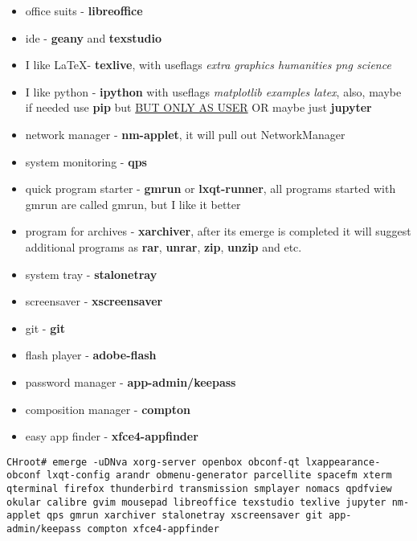 \documentclass[11pt,a4paper]{article}
\begin{document}
\begin{itemize}
                        \item office suits - \textbf{libreoffice}
                        \item ide - \textbf{geany} and \textbf{texstudio}
                        \item I like \LaTeX - \textbf{texlive}, with useflags \textit{extra graphics humanities png science}
                        \item I like python - \textbf{ipython} with useflags \textit{matplotlib examples latex}, also, maybe if needed use \textbf{pip} but \href{https://wiki.gentoo.org/wiki/Pip#Invocation}{BUT ONLY AS USER} OR maybe just \textbf{jupyter}
                        \item network manager - \textbf{nm-applet}, it will pull out NetworkManager
                        \item system monitoring - \textbf{qps}
                        \item quick program starter - \textbf{gmrun} or \textbf{lxqt-runner}, all programs started with gmrun are called gmrun, but I like it better
                        \item program for archives - \textbf{xarchiver}, after its emerge is completed it will suggest additional programs as \textbf{rar}, \textbf{unrar}, \textbf{zip}, \textbf{unzip} and etc.
                        \item system tray - \textbf{stalonetray}
                        \item screensaver - \textbf{xscreensaver}
                        \item git - \textbf{git}
                        \item flash player - \textbf{adobe-flash}
                        \item password manager - \textbf{app-admin/keepass}
                        \item composition manager - \textbf{compton}
                        \item easy app finder - \textbf{xfce4-appfinder}
                    \end{itemize}

                    \begin{lstlisting}[style=BashInputCHRoot]
 CHroot# emerge -uDNva xorg-server openbox obconf-qt lxappearance-obconf lxqt-config arandr obmenu-generator parcellite spacefm xterm qterminal firefox thunderbird transmission smplayer nomacs qpdfview okular calibre gvim mousepad libreoffice texstudio texlive jupyter nm-applet qps gmrun xarchiver stalonetray xscreensaver git app-admin/keepass compton xfce4-appfinder
                    \end{lstlisting}
\end{document}
